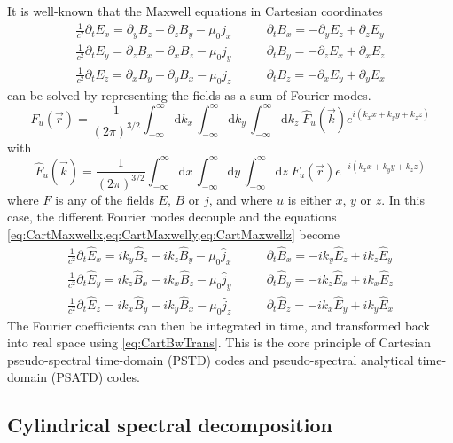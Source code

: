 \documentclass[a4paper]{article}   	%
\newcommand{\Integ}[1]{\int_{-\infty}^{\infty} \!\!\!\!\!
  \mathrm{d}#1}
\begin{document}
It is well-known that the Maxwell equations in Cartesian coordinates 
\begin{align}
\frac{1}{c^2}\partial_t E_x = \partial_y B_z - \partial_z B_y - \mu_0  j_x \qquad&   
\partial_t B_x = -\partial_y E_z + \partial_z E_y \label{eq:CartMaxwellx} \\
\frac{1}{c^2}\partial_t E_y = \partial_z B_x - \partial_x B_z - \mu_0  j_y \qquad &   
\partial_t B_y = -\partial_z E_x + \partial_x E_z \label{eq:CartMaxwelly}  \\
\frac{1}{c^2}\partial_t E_z = \partial_x B_y - \partial_y B_x - \mu_0  j_z \qquad &   
\partial_t B_z = -\partial_x E_y + \partial_y E_x \label{eq:CartMaxwellz} 
\end{align}
can be solved by representing the fields as a sum of Fourier modes.
\begin{equation}
\label{eq:CartBwTrans}
F_u(\vec{r}) = \frac{1}{(2\pi)^{3/2}}\Integ{k_x} \,\Integ{k_y}\, \Integ{k_z} \; \hat{F}_u(\vec{k}) e^{i(k_x x + k_y y + k_z z)} 
\end{equation}
with 
\begin{equation}
\label{eq:CartFwTrans}
\hat{F}_u(\vec{k})  = \frac{1}{(2\pi)^{3/2}}\Integ{x} \,\Integ{y}\, \Integ{z} \; F_u(\vec{r}) e^{-i(k_x x + k_y y + k_z z)} 
\end{equation}
where $F$ is any of the fields $E$, $B$ or $j$, and where $u$ is
either $x$, $y$ or $z$. In this case, the different Fourier modes decouple and the equations \cref{eq:CartMaxwellx,eq:CartMaxwelly,eq:CartMaxwellz} become 
\begin{align}
\frac{1}{c^2}\partial_t \hat{E}_x = ik_y \hat{B}_z - ik_z \hat{B}_y - \mu_0 \hat{j}_x \qquad &   
\partial_t \hat{B}_x = -ik_y \hat{E}_z + ik_z \hat{E}_y \\
\frac{1}{c^2}\partial_t \hat{E}_y = ik_z \hat{B}_x - ik_x \hat{B}_z - \mu_0  \hat{j}_y \qquad &   
\partial_t \hat{B}_y = -ik_z \hat{E}_x + ik_x \hat{E}_z \\
\frac{1}{c^2}\partial_t \hat{E}_z = ik_x \hat{B}_y - ik_y \hat{B}_x - \mu_0 \hat{j}_z  \qquad &   
\partial_t \hat{B}_z = -ik_x \hat{E}_y + ik_y \hat{E}_x 
\end{align}
The Fourier coefficients can then be integrated in time, and
transformed back into real space using \cref{eq:CartBwTrans}. This is
the core principle of Cartesian pseudo-spectral time-domain (PSTD)
codes and pseudo-spectral analytical time-domain (PSATD) codes.

\subsection{Cylindrical spectral decomposition}
\end{document}
